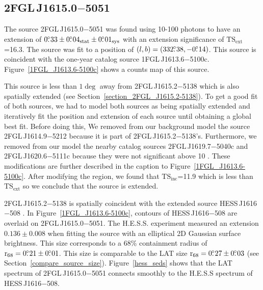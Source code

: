 \documentclass[12pt,preprint]{aastex}
\newcommand{\gev}{\text{GeV}\xspace}
\newcommand{\tev}{\text{TeV}\xspace}
\newcommand{\tsext}{{\ensuremath{\text{TS}_{\text{ext}}}}\xspace}
\newcommand{\tsinc}{\ensuremath{\text{TS}_{\text{inc}}}\xspace}
\newcommand{\rsixeight}{{\ensuremath{\text{r}_{68}}}\xspace}
\newcommand{\sys}{\text{sys}\xspace}
\newcommand{\stat}{\text{stat}\xspace}
\begin{document}
\subsection{2FGL\,J1615.0$-$5051}
\label{section_2FGL_J1615.0-5051}


The source 2FGL\,J1615.0$-$5051 was found using 10-100 \tev
photons to have an extension of $0\fdg33\pm0\fdg04_\stat\pm0\fdg01_\sys$
with an extension significance of \tsext=16.3.  The source
was fit to a position of $(l,b)=(332\mbox{$.\!\!^\circ$}38,-0\mbox{$.\!\!^\circ$}14)$.
This source is coincident with the one-year catalog source
1FGL\,J1613.6$-$5100c. Figure~\ref{1FGL_J1613.6-5100c} shows a counts map
of this source.

This source is less than $1\deg$ away from 2FGL\,J1615.2$-$5138 which is
also spatially extended (see Section~\ref{section_2FGL_J1615.2-5138}).
To get a good fit of both sources, we had to model both sources as
being spatially extended and iteratively fit the position and extension
of each source until obtaining a global best fit.  Before doing this,
We removed from our background model the source 2FGL\,J1614.9$-$5212 because it is
part of 2FGL\,J1615.2$-$5138's. Furthermore, we removed from our model the nearby catalog
sources 2FGL\,J1619.7$-$5040c and 2FGL\,J1620.6$-$5111c because they were not
significant above 10 \gev.  These modifications are further described
in the caption to Figure~\ref{1FGL_J1613.6-5100c}.  After modifying
the region, we found that \tsinc=11.9 which is less than \tsext so we
conclude that the source is extended.

2FGL\,J1615.2$-$5138 is spatially coincident with the extended
\tev source HESS\,J1616$-$508 \citep{hess_plane_survey}.  In
Figure~\ref{1FGL_J1613.6-5100c}, contours of HESS\,J1616$-$508 are overlaid
on 2FGL\,J1615.0$-$5051.  The H.E.S.S. experiment measured an
extension $0.136\pm 0.008$ when fitting the source with an elliptical
2D Gaussian surface brightness.  This size corresponds to a 68\% containment
radius of $\rsixeight=0\fdg21\pm0\fdg01$. This size is comparable to the LAT
size $\rsixeight=0\fdg27\pm0\fdg03$ (see Section~\ref{compare_source_size}).
Figure~\ref{hess_seds} shows that the LAT spectrum of 2FGL\,J1615.0$-$5051
connects smoothly to the H.E.S.S spectrum of HESS\,J1616$-$508.
\end{document}
